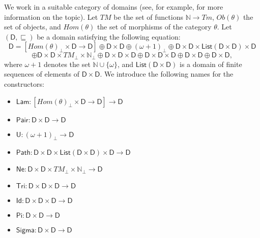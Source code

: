 \documentclass{amsart}
\theoremstyle{definition}
\theoremstyle{remark}
\newcommand{\D}{\mathsf{D}}
\newcommand{\nats}{\mathbb{N}}
\numberwithin{table}{section}
\begin{document}
We work in a suitable category of domains (see, for example, \cite{domains} for more information on the topic).
Let $TM$ be the set of functions $\nats \to Tm$, $Ob(\theta)$ the set of objects, and $Hom(\theta)$ the set of morphisms of the category $\theta$.
Let $(\D,\sqsubseteq)$ be a domain satisfying the following equation:
\[ \D = [Hom(\theta)_\bot \times \D \to \D] \oplus \D \times \D \oplus (\omega + 1)_\bot \oplus \D \times \D \times \mathsf{List}(\D \times \D) \times \D \]
\[ \oplus \D \times \D \times TM_\bot \times \nats_\bot \oplus \D \times \D \times \D \oplus \D \times \D \times \D \oplus \D \times \D \oplus \D \times \D, \]
where $\omega + 1$ denotes the set $\nats \cup \{ \omega \}$, and $\mathsf{List}(\D \times \D)$ is a domain of finite sequences of elements of $\D \times \D$.
We introduce the following names for the constructors:
\begin{itemize}
\item[] $\mathsf{Lam} : [Hom(\theta)_\bot \times \D \to \D] \to \D$
\item[] $\mathsf{Pair} : \D \times \D \to \D$
\item[] $\mathsf{U} : (\omega + 1)_\bot \to \D$
\item[] $\mathsf{Path} : \D \times \D \times \mathsf{List}(\D \times \D) \times \D \to \D$
\item[] $\mathsf{Ne} : \D \times \D \times TM_\bot \times \nats_\bot \to \D$
\item[] $\mathsf{Tri} : \D \times \D \times \D \to \D$
\item[] $\mathsf{Id} : \D \times \D \times \D \to \D$
\item[] $\mathsf{Pi} : \D \times \D \to \D$
\item[] $\mathsf{Sigma} : \D \times \D \to \D$
\end{itemize}
\end{document}
